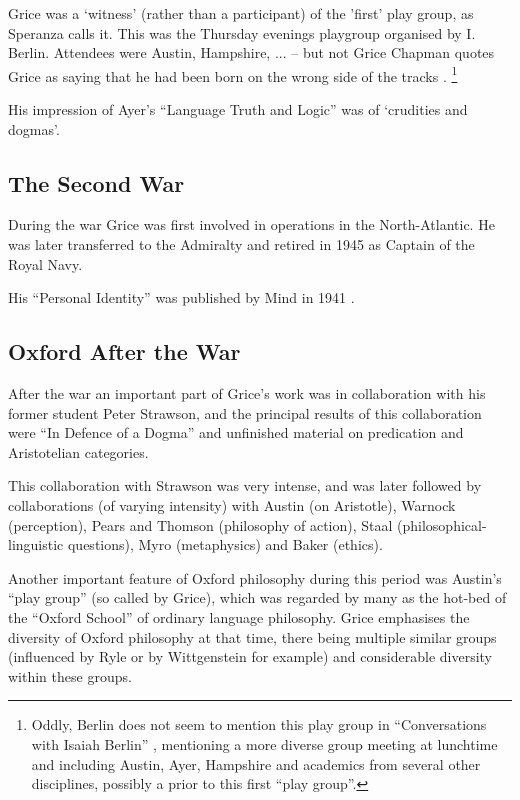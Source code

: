 \documentclass[10pt,titlepage]{book}
\begin{document}
Grice was a `witness' (rather than a participant) of the 'first' play group, as Speranza calls it.
This  was the Thursday evenings playgroup organised by I. Berlin.
Attendees were Austin, Hampshire, ... -- but not Grice
Chapman quotes Grice as saying that he had been born on the wrong side of the tracks \cite{chapman2006}.
\footnote{Oddly, Berlin does not seem to mention this play group in ``Conversations with Isaiah Berlin'' \cite{berlin91}, mentioning a more diverse group meeting at lunchtime and including Austin, Ayer, Hampshire and academics from several other disciplines, possibly a prior to this first ``play group''.}

His impression of Ayer's ``Language Truth and Logic'' \cite{ayer1936} was of `crudities and dogmas'.

\subsection{The Second War}

During the war Grice was first involved in operations in the North-Atlantic.
He was later transferred to the Admiralty and retired in 1945 as Captain of the Royal  
Navy.

His ``Personal Identity'' was published by Mind in 1941 \cite{grice41}. 

\subsection{Oxford After the War}

After the war an important part of Grice's work was in collaboration with his former student Peter Strawson, and the principal results of this collaboration were ``In Defence of a Dogma'' \cite{grice56} and unfinished material on predication and Aristotelian categories.

This collaboration with Strawson was very intense, and was later followed by collaborations (of varying intensity) with Austin (on Aristotle), Warnock (perception), Pears and Thomson (philosophy of action), Staal (philosophical-linguistic questions), Myro (metaphysics) and Baker (ethics).

Another important feature of Oxford philosophy during this period was Austin's ``play group'' (so called by Grice), which was regarded by many as the hot-bed of the ``Oxford School'' of ordinary language philosophy.
Grice emphasises the diversity of Oxford philosophy at that time, there being multiple similar groups (influenced by Ryle or by Wittgenstein for example) and considerable diversity within these groups.  
\end{document}
